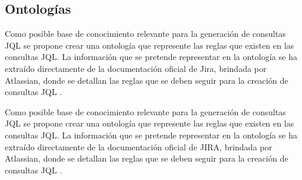 \subsection{Ontologías}
  Como posible base de conocimiento relevante para la generación de consultas JQL se propone crear una ontología que represente las reglas que existen en las consultas JQL. La información que se pretende representar en la ontología se ha extraído directamente de la documentación oficial de Jira, brindada por Atlassian, donde se detallan las reglas que se deben seguir para la creación de consultas JQL \cite{jiradocs}.

Como posible base de conocimiento relevante para la generación de consultas JQL se propone crear una ontología que represente las reglas que existen en las consultas JQL. La información que se pretende representar en la ontología se ha extraído directamente de la documentación oficial de JIRA, brindada por Atlassian, donde se detallan las reglas que se deben seguir para la creación de consultas JQL \cite{jiradocs}.